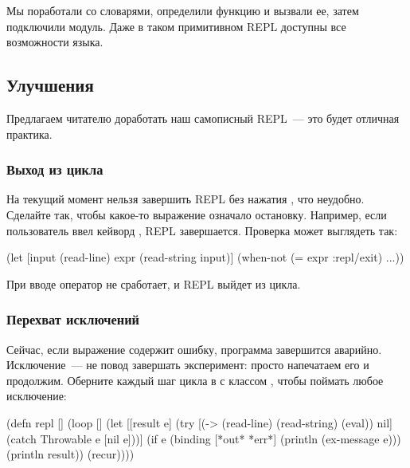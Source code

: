 Мы поработали со словарями, определили функцию и вызвали ее, затем подключили модуль. Даже в таком примитивном REPL доступны все возможности языка.

\subsection{Улучшения}

Предлагаем читателю доработать наш самописный REPL~--- это будет отличная практика.

\subsubsection{Выход из цикла}

На текущий момент нельзя завершить REPL без нажатия , что неудобно. Сделайте так, чтобы какое-то выражение означало остановку. Например, если пользователь ввел кейворд , REPL завершается. Проверка может выглядеть так:

\begin{english}
  \begin{clojure}
(let [input (read-line)
      expr (read-string input)]
  (when-not (= expr :repl/exit)
    ...))
  \end{clojure}
\end{english}

При вводе  оператор  не сработает, и REPL выйдет из цикла.

\subsubsection{Перехват исключений}

Сейчас, если выражение содержит ошибку, программа завершится аварийно. Исключение~--- не повод завершать эксперимент: просто напечатаем его и продолжим. Оберните каждый шаг цикла в  с классом , чтобы поймать любое исключение:

\begin{english}
  \begin{clojure}
(defn repl []
  (loop []
    (let [[result e]
          (try
            [(-> (read-line)
                 (read-string)
                 (eval))
             nil]
            (catch Throwable e
              [nil e]))]
      (if e
        (binding [*out* *err*]
          (println (ex-message e)))
        (println result))
      (recur))))
  \end{clojure}
\end{english}

